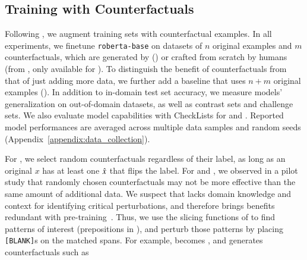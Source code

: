 \subsection{Training with Counterfactuals}

\label{subsec:augmentation}
Following \citet{kaushik2019learning}, we augment training sets with counterfactual examples.
In all experiments, we finetune \texttt{roberta-base} on datasets of $n$ original examples and $m$ counterfactuals, which are generated by \sysname (\maug) or crafted from scratch by humans (\mcad from \citet{kaushik2019learning}, only available for \nli). To distinguish the benefit of counterfactuals from that of just adding more data, we further add a baseline that uses $n+m$ original examples (\mcomp).
In addition to in-domain test set accuracy, we measure models' generalization on out-of-domain datasets, as well as contrast sets and challenge sets.
We also evaluate model capabilities with CheckLists \cite{checklist:acl20} for \sst and \qqp.
Reported model performances are averaged across multiple data samples and random seeds (Appendix~\ref{appendix:data_collection}).


For \sst, we select random \sysname counterfactuals regardless of their label, as long as an original $x$ has at least one $\hat{x}$ that flips the label.
For \nli and \qqp, we observed in a pilot study that randomly chosen counterfactuals may not be more effective than the same amount of additional data.
We suspect that \sysname lacks domain knowledge and context for identifying critical perturbations, and therefore brings benefits redundant with pre-training~\cite{longpre2020effective}.
Thus, we use the slicing functions of \citet{chen2019slice} to find patterns of interest (\eg prepositions in \nli), and perturb those patterns by placing \texttt{[BLANK]}s on the matched spans. For example,  becomes , and \sysname generates counterfactuals such as 




